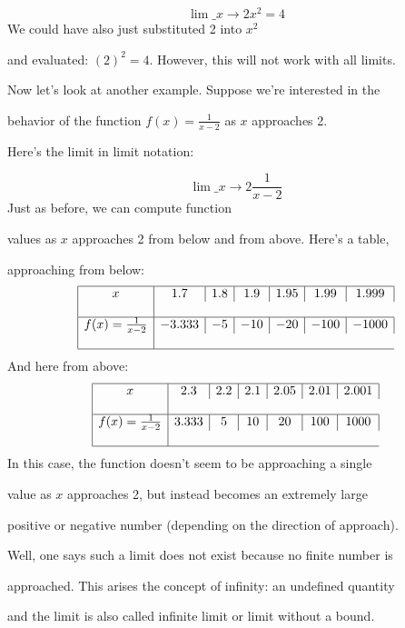 $$\lim\_{x\to2}x^2=4$$ We could have also just substituted 2 into $x^2$

and evaluated: $(2)^2=4$. However, this will not work with all limits.



Now let's look at another example. Suppose we're interested in the

behavior of the function $f(x)=\frac{1}{x-2}$ as $x$ approaches 2.

Here's the limit in limit notation:



$$\lim\_{x\to 2}\frac{1}{x-2}$$ Just as before, we can compute function

values as $x$ approaches 2 from below and from above. Here's a table,

approaching from below:
$$
\begin{array}{|c|c|c|c|c|c|c|}

\hline

x & 1.7 & 1.8 & 1.9 & 1.95 & 1.99 & 1.999 \\\\ \hline

f(x)=\frac{1}{x-2} & -3.333 & -5 & -10 & -20 & -100 & -1000 \\\\ \hline

\end{array}
$$ 
And here from above:
$$
\begin{array}{|c|c|c|c|c|c|c|}

\hline

x & 2.3 & 2.2 & 2.1 & 2.05 & 2.01 & 2.001 \\\\ \hline

f(x)=\frac{1}{x-2} & 3.333 & 5 & 10 & 20 & 100 & 1000 \\\\ \hline

\end{array}
$$ 
In this case, the function doesn't seem to be approaching a single

value as $x$ approaches 2, but instead becomes an extremely large

positive or negative number (depending on the direction of approach).

Well, one says such a limit does not exist because no finite number is

approached. This arises the concept of infinity: an undefined quantity

and the limit is also called infinite limit or limit without a bound.



